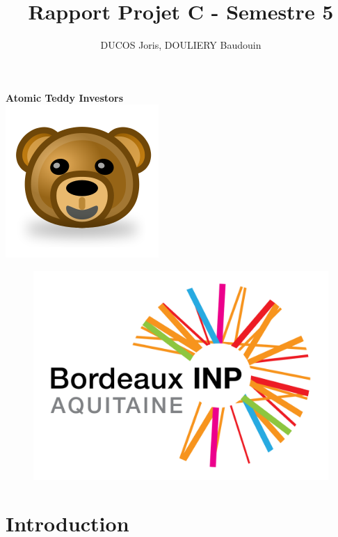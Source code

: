 \documentclass{article}
\begin{document}
\pagestyle{fancy}


\title{Rapport Projet C - Semestre 5}

\author{DUCOS Joris, DOULIERY Baudouin}
\date{}
\maketitle
\begin{center}
  \centering
  \huge
  \textbf{Atomic Teddy Investors} \\
  \includegraphics[scale=1]{teddy.png}
  \end{center}
\begin{figure}[t]
  \centering
  \includegraphics[scale=0.1]{Logo_INPB.png}
\end{figure}


\newpage
\newpage

\tableofcontents

\newpage


\section{Introduction}
\end{document}
